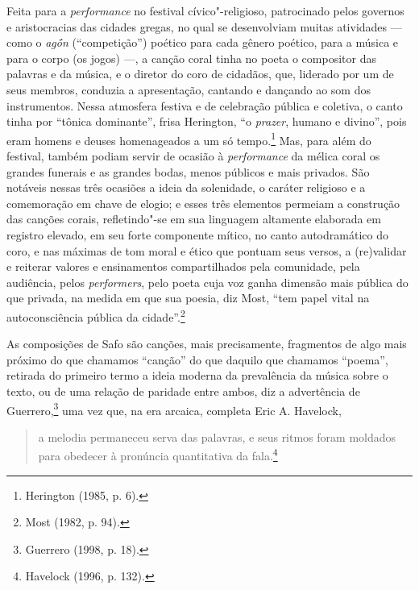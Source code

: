Feita para a \textit{performance} no festival cívico"-religioso, patrocinado
pelos governos e aristocracias das cidades gregas, no qual se
desenvolviam muitas atividades --- como o \textit{agṓn} (“competição”) poético
para cada gênero poético, para a música e para o corpo (os jogos) \mbox{---,} a canção coral tinha no poeta o compositor das palavras e
da música, e o diretor do coro de cidadãos, que, liderado por um de seus
membros, conduzia a apresentação, cantando e dançando ao som dos instrumentos.
Nessa atmosfera festiva e de celebração pública e coletiva, o canto tinha por
“tônica dominante”, frisa Herington, “o \textit{prazer}, humano e
divino”, pois eram homens e deuses homenageados a um só tempo.\footnote{ Herington (1985, p. 6).} Mas, para além
do festival, também podiam servir de ocasião à
\textit{performance} da mélica coral os grandes funerais e as grandes bodas,
menos públicos e mais privados. São notáveis nessas três ocasiões a ideia da
solenidade, o caráter religioso e a comemoração em chave de elogio; e esses
três elementos permeiam a construção das canções corais, refletindo"-se
em sua linguagem altamente elaborada em registro elevado, em seu forte
componente mítico, no canto autodramático do coro, e nas máximas de tom moral
e ético que pontuam seus versos, a (re)validar e reiterar valores e
ensinamentos compartilhados pela comunidade, pela audiência, pelos
\textit{performers}, pelo poeta cuja voz ganha dimensão mais
pública do que privada, na medida em que sua poesia, diz Most,
“tem papel vital na autoconsciência pública da cidade”.\footnote{ Most (1982, p. 94).}


\noindent{}As composições de Safo são canções, mais
precisamente, fragmentos de algo mais próximo do que chamamos “canção” do que
daquilo que chamamos “poema”, retirada do primeiro termo a ideia moderna da
prevalência da música sobre o texto, ou de uma relação de paridade entre ambos,
diz a advertência de Guerrero,\footnote{ Guerrero (1998, p. 18).} uma vez que, na era arcaica, completa Eric A. Havelock, 

\begin{quote}
a melodia permaneceu serva
das palavras, e seus ritmos foram moldados para obedecer à pronúncia
quantitativa da fala.\footnote{ Havelock (1996, p. 132).}
\end{quote}

